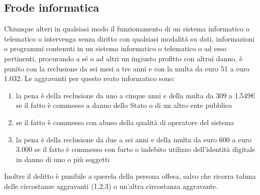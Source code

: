 \subsection{Frode informatica}
Chiunque alteri in qualsiasi modo il funzionamento di un sistema informatico o
telematico o intervenga senza diritto con qualsiasi modalità su dati,
informazioni o programmi contenuti in un sistema informatico o telematico o ad
esso pertinenti, procurando a sé o ad altri un ingiusto profitto con altrui
danno, è punito con la reclusione da sei mesi a tre anni e con la multa da euro
51 a euro 1.032.
\newline
Le aggravanti per questo reato informatico sono:
\begin{enumerate}
    \item la pena è della reclusione da uno a cinque anni e della multa da 309
        a 1.549€ se il fatto è commesso a danno dello Stato o di un altro ente
        pubblico
    \item se il fatto è commesso con abuso della qualità di operatore del sistema
    \item la pena è della reclusione da due a sei anni e della multa da euro
        600 a euro 3.000 se il fatto è commesso con furto o indebito utilizzo
        dell'identità digitale in danno di uno o più soggetti
\end{enumerate}
Inoltre il delitto è punibile a querela della persona offesa, salvo che ricorra
taluna delle circostanze aggravanti (1,2,3) o un'altra circostanza aggravante.
